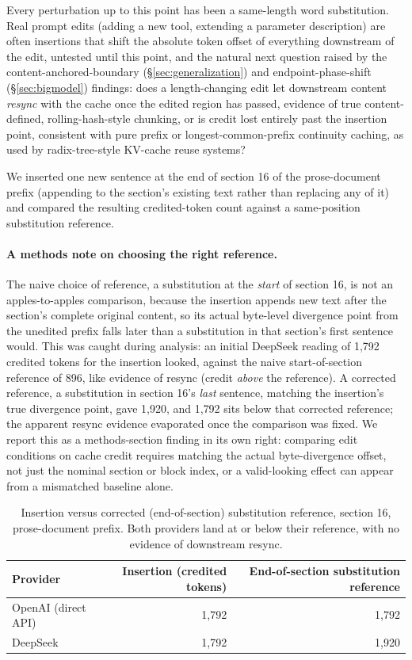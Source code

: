 \documentclass[11pt]{article}
\begin{document}
Every perturbation up to this point has been a same-length word
substitution. Real prompt edits (adding a new tool, extending a parameter
description) are often insertions that shift the absolute token offset of
everything downstream of the edit, untested until this point, and the
natural next question raised by the content-anchored-boundary
(\S\ref{sec:generalization}) and endpoint-phase-shift (\S\ref{sec:bigmodel})
findings: does a length-changing edit let downstream content
\emph{resync} with the cache once the edited region has passed, evidence of
true content-defined, rolling-hash-style chunking, or is credit lost
entirely past the insertion point, consistent with pure prefix or
longest-common-prefix continuity caching, as used by radix-tree-style
KV-cache reuse systems?

We inserted one new sentence at the end of section 16 of the prose-document
prefix (appending to the section's existing text rather than replacing any
of it) and compared the resulting credited-token count against a same-position
substitution reference.

\paragraph{A methods note on choosing the right reference.} The naive
choice of reference, a substitution at the \emph{start} of section 16, is
not an apples-to-apples comparison, because the insertion appends new text
after the section's complete original content, so its actual
byte-level divergence point from the unedited prefix falls later than a
substitution in that section's first sentence would. This was caught during
analysis: an initial DeepSeek reading of 1{,}792 credited tokens for the
insertion looked, against the naive start-of-section reference of 896,
like evidence of resync (credit \emph{above} the reference). A corrected
reference, a substitution in section 16's \emph{last} sentence, matching
the insertion's true divergence point, gave 1{,}920, and 1{,}792 sits below
that corrected reference; the apparent resync evidence evaporated once the
comparison was fixed. We report this as a methods-section finding in its
own right: comparing edit conditions on cache credit requires matching the
actual byte-divergence offset, not just the nominal section or block
index, or a valid-looking effect can appear from a mismatched baseline
alone.

\begin{table}[t]
\centering
\caption{Insertion versus corrected (end-of-section) substitution
reference, section 16, prose-document prefix. Both providers land at or
below their reference, with no evidence of downstream resync.}
\label{tab:insertion}
\begin{tabular}{@{}lrr@{}}
\toprule
Provider & Insertion (credited tokens) & End-of-section substitution reference \\
\midrule
OpenAI (direct API) & 1{,}792 & 1{,}792 \\
DeepSeek             & 1{,}792 & 1{,}920 \\
\bottomrule
\end{tabular}
\end{table}
\end{document}
